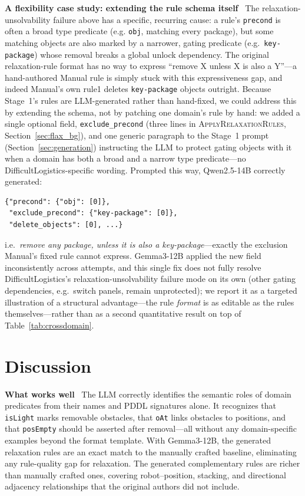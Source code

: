 \documentclass[letterpaper, 10pt, journal, twoside]{IEEEtran}
\newcommand{\sref}[1]{Section~\ref{#1}}
\newcommand{\tref}[1]{Table~\ref{#1}}
\newcommand{\myparagraph}[1]{\noindent\textbf{#1}~}
\begin{document}
\myparagraph{A flexibility case study: extending the rule schema itself}
\label{sec:exclude_precond}
The relaxation-unsolvability failure above has a specific, recurring cause: a rule's \texttt{precond} is often a broad type predicate (e.g. \texttt{obj}, matching every package), but some matching objects are also marked by a narrower, gating predicate (e.g.\ \texttt{key-package}) whose removal breaks a global unlock dependency. The original relaxation-rule format has no way to express ``remove X unless X is also a Y''---a hand-authored Manual rule is simply stuck with this expressiveness gap, and indeed Manual's own rule1 deletes \texttt{key-package} objects outright.
Because Stage~1's rules are LLM-generated rather than hand-fixed, we could address this by extending the schema, not by patching one domain's rule by hand: we added a single optional field, \texttt{exclude\_precond} (three lines in \textsc{ApplyRelaxationRules}, \sref{sec:flax_bg}), and one generic paragraph to the Stage~1 prompt (\sref{sec:generation}) instructing the LLM to protect gating objects with it when a domain has both a broad and a narrow type predicate---no DifficultLogistics-specific wording. Prompted this way, Qwen2.5-14B correctly generated:
\begin{small}
\begin{verbatim}
{"precond": {"obj": [0]},
 "exclude_precond": {"key-package": [0]},
 "delete_objects": [0], ...}
\end{verbatim}
\end{small}
i.e.\ \emph{remove any package, unless it is also a key-package}---exactly the exclusion Manual's fixed rule cannot express. Gemma3-12B applied the new field inconsistently across attempts, and this single fix does not fully resolve DifficultLogistics's relaxation-unsolvability failure mode on its own (other gating dependencies, e.g.\ switch panels, remain unprotected); we report it as a targeted illustration of a structural advantage---the rule \emph{format} is as editable as the rules themselves---rather than as a second quantitative result on top of \tref{tab:crossdomain}.


\section{Discussion}
\label{sec:discussion}

\myparagraph{What works well}
The LLM correctly identifies the semantic roles of domain predicates from their names and PDDL signatures alone.
It recognizes that \texttt{isLight} marks removable obstacles, that \texttt{oAt} links obstacles to positions, and that \texttt{posEmpty} should be asserted after removal---all without any domain-specific examples beyond the format template.
With Gemma3-12B, the generated relaxation rules are an exact match to the manually crafted baseline, eliminating any rule-quality gap for relaxation.
The generated complementary rules are richer than manually crafted ones, covering robot--position, stacking, and directional adjacency relationships that the original authors did not include.
\end{document}
